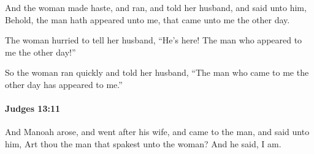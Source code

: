 			\begin{versebox}
					\item[BHS] 
					\item[ASV] And the woman made haste, and ran, and told her husband, and said unto him, Behold, the man hath appeared unto me, that came unto me the other day.
					\item[NIV] The woman hurried to tell her husband, “He’s here! The man who appeared to me the other day!”
					\item[NRSV] So the woman ran quickly and told her husband, “The man who came to me the other day has appeared to me.”
			\end{versebox}

		\paragraph{Judges 13:11} %
			\label{JUDGES-13-11}

			And Manoah arose, and went after his wife, and came to the man, and said unto him, Art thou the man that spakest unto the woman? And he said, I am.

